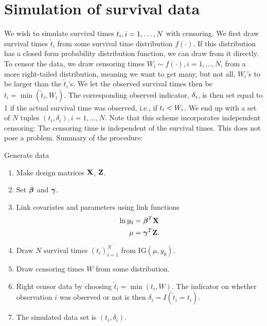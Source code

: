 \section{Simulation of survival data}

We wish to simulate survival times $t_{i},i=1,\ldots,N$ with censoring. We first draw survival times $\tilde{t}_i$ from some survival time distribution $f(\cdot)$. If this distribution has a closed form probability distribution function, we can draw from it directly.
To censor the data, we draw censoring times $W_i\sim f(\cdot),i=1,\ldots,N$, from a more right-tailed distribution, meaning we want to get many, but not all, $W_i$'s to be larger than the $\tilde{t}_i$'s. We let the observed survival times then be $t_i=\min(\tilde{t}_i,W_i)$.
The corresponding observed indicator, $\delta_{i}$, is then set equal to 1 if the actual survival time was observed, i.e., if $t_{i}<W_i$. We end up with a set of $N$ tuples $(t_i,\delta_i),i=1,\ldots,N$. Note that this scheme incorporates independent censoring: The censoring time is independent of the survival times. This does not pose a problem. Summary of the procedure:

\begin{algorithm}
\caption{Generate data}
\label{algo:sim}
\begin{enumerate}
    \item Make design matrices $\mathbf{X}$, $\mathbf{Z}$.
    \item Set $\boldsymbol{\beta}$ and $\boldsymbol{\gamma}$.
    \item Link covariates and parameters using link functions
        \begin{align*}
            \ln y_0&=\boldsymbol{\beta}^T\mathbf{X} \\
            \mu&=\boldsymbol{\gamma}^T\mathbf{Z}.
        \end{align*}
    \item Draw $N$ survival times $(t_i)_{i=1}^N$ from IG$(\mu,y_0)$.
    \item Draw censoring times $W$ from some distribution.
    \item Right censor data by choosing $\widetilde{t}_i=\min(t_i,W)$. The indicator on whether observation $i$ was observed or not is then $\delta_i=I(\widetilde{t}_i=t_i)$.
    \item The simulated data set is $(t_i,\delta_i)$.
\end{enumerate}
\end{algorithm}
